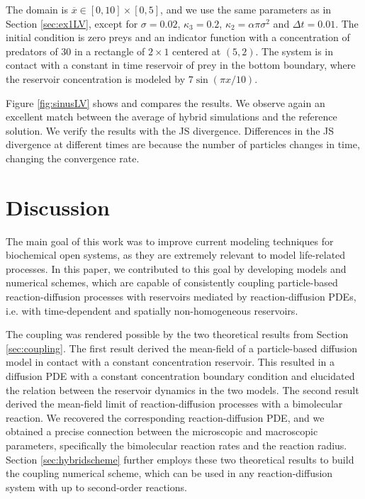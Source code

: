 \documentclass[10pt,twocolumn]{revtex4-1}
\begin{document}
	The domain is $\overline{x}\in[0,10]\times[0,5]$, and we use the same parameters as in Section \ref{sec:ex1LV}, except for $\sigma=0.02$, $\kappa_3=0.2$, $\kappa_2=\alpha \pi \sigma^2$ and $\Delta t=0.01$. The initial condition is zero preys and an indicator function with a concentration of predators of $30$ in a rectangle of $2\times 1$ centered at $(5,2)$. The system is in contact with a constant in time reservoir of prey in the bottom boundary, where the reservoir concentration is modeled by $7\sin(\pi x/10)$.
	
	
	Figure \ref{fig:sinusLV} shows and compares the results. We observe again an excellent match between the average of hybrid simulations and the reference solution. We verify the results with the JS divergence. Differences in the JS divergence at different times are because the number of particles changes in time, changing the convergence rate.

	\section{Discussion}
	The main goal of this work was to improve current modeling techniques for biochemical open systems, as they are extremely relevant to model life-related processes. In this paper, we contributed to this goal by developing models and numerical schemes, which are capable of consistently coupling particle-based reaction-diffusion processes with reservoirs mediated by reaction-diffusion PDEs, i.e. with time-dependent and spatially non-homogeneous reservoirs.
	
	The coupling was rendered possible by the two theoretical results from Section \ref{sec:coupling}. The first result derived the mean-field of a particle-based diffusion model in contact with a constant concentration reservoir. This resulted in a diffusion PDE with a constant concentration boundary condition and elucidated the relation between the reservoir dynamics in the two models. The second result derived the mean-field limit of reaction-diffusion processes with a bimolecular reaction. We recovered the corresponding reaction-diffusion PDE, and we obtained a precise connection between the microscopic and macroscopic parameters, specifically the bimolecular reaction rates and the reaction radius. Section \ref{sec:hybridscheme} further employs these two theoretical results to build the coupling numerical scheme, which can be used in any reaction-diffusion system with up to second-order reactions.
	
\end{document}
